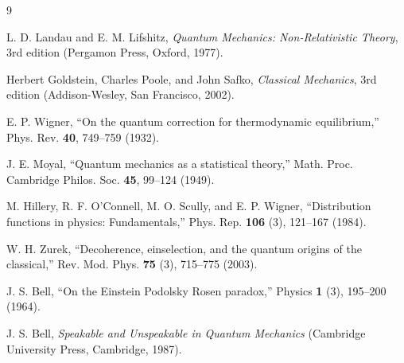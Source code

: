 \documentclass[prb,preprint]{revtex4-1}
\begin{document}
\begin{thebibliography}{9}

 L. D. Landau and E. M. Lifshitz, \textit{Quantum Mechanics:
Non-Relativistic Theory}, 3rd edition (Pergamon Press, Oxford, 1977).

 Herbert Goldstein, Charles Poole, and John Safko,
\textit{Classical Mechanics}, 3rd edition (Addison-Wesley, San Francisco, 2002).

 E. P. Wigner, ``On the quantum correction for thermodynamic
equilibrium,'' Phys. Rev. \textbf{40}, 749--759 (1932).

 J. E. Moyal, ``Quantum mechanics as a statistical theory,''
Math. Proc. Cambridge Philos. Soc. \textbf{45}, 99--124 (1949).

 M. Hillery, R. F. O'Connell, M. O. Scully, and E. P. Wigner,
``Distribution functions in physics: Fundamentals,''
Phys. Rep. \textbf{106} (3), 121--167 (1984).

 W. H. Zurek, ``Decoherence, einselection, and the quantum
origins of the classical,'' Rev. Mod. Phys. \textbf{75} (3), 715--775 (2003).

 J. S. Bell, ``On the Einstein Podolsky Rosen paradox,''
Physics \textbf{1} (3), 195--200 (1964).

 J. S. Bell, \textit{Speakable and Unspeakable in Quantum Mechanics}
(Cambridge University Press, Cambridge, 1987).

\end{thebibliography}
\end{document}
